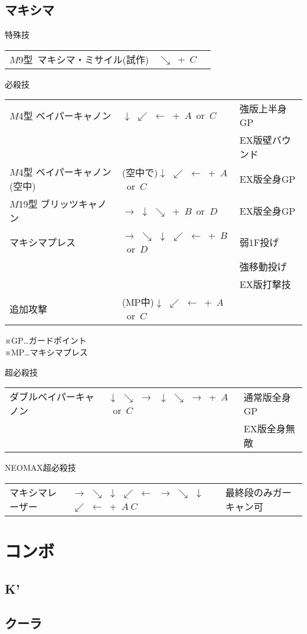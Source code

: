 \documentclass[a4j,11pt]{jarticle}
\def\hado{$\downarrow$ $\searrow$ $\rightarrow$}%
\def\tatsu{$\downarrow$ $\swarrow$ $\leftarrow$}%
\def\syoryu{$\rightarrow$ $\downarrow$ $\searrow$}%
\def\gyakuyoga{$\rightarrow$ $\searrow$ $\downarrow$ $\swarrow$ $\leftarrow$}%
\begin{document}
\subsection{マキシマ}
\begin{itembox}[l]{特殊技}
\begin{tabular}{lll}
$M$9型\ マキシマ・ミサイル(試作)&$\searrow$\ +\ $C$&%
\end{tabular}
\end{itembox}
\begin{itembox}[l]{必殺技}
\begin{tabular}{lll}
$M$4型 ベイパーキャノン&\tatsu\ +\ $A$\ or\ $C$&強版上半身GP\\%
&&EX版壁バウンド\\
$M$4型 ベイパーキャノン(空中)&(空中で)\tatsu\ +\ $A$\ or\ $C$&EX版全身GP\\%
$M$19型 ブリッツキャノン&\syoryu\ +\ $B$\ or\ $D$&EX版全身GP\\%
マキシマプレス&\gyakuyoga\ +\ $B$\ or\ $D$&弱1F投げ\\%
&&強移動投げ\\
&&EX版打撃技\\
追加攻撃&(MP中)\tatsu\ +\ $A$\ or\ $C$&
\end{tabular}
\end{itembox}
※GP…ガードポイント\\
※MP…マキシマプレス\\
\begin{itembox}[l]{超必殺技}
\begin{tabular}{lll}
ダブルベイパーキャノン&\hado\ \hado\ +\ $A$\ or\ $C$&通常版全身GP\\%
&&EX版全身無敵
\end{tabular}
\end{itembox}
\begin{itembox}[l]{NEOMAX超必殺技}
\begin{tabular}{lll}
マキシマレーザー&\gyakuyoga\ \gyakuyoga\ +\ $A\ C$&最終段のみガーキャン可%
\end{tabular}
\end{itembox}
\newpage
\section{コンボ}
\subsection{K'}
\subsection{クーラ}
\end{document}
